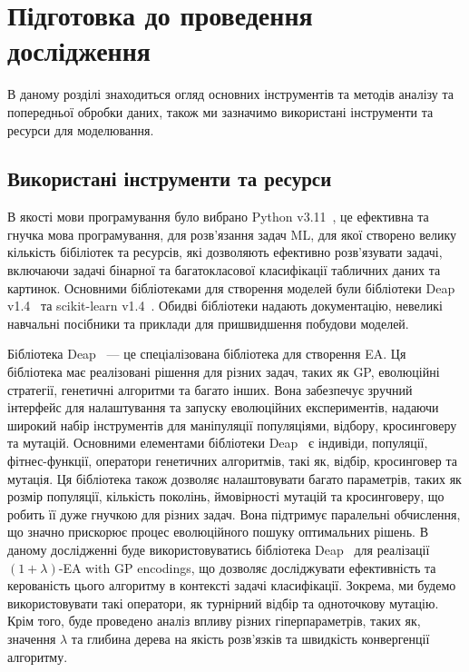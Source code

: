 \chapter{Підготовка до проведення дослідження}
\label{chap:theory}

В даному розділі знаходиться огляд основних інструментів та методів аналізу та попередньої обробки даних, також ми зазначимо використані інструменти та ресурси для моделювання.

\section{Використані інструменти та ресурси}

В якості мови програмування було вибрано Python v3.11~\cite{ct18}, це ефективна та гнучка мова програмування, для розв'язання задач ML, для якої створено велику кількість бібіліотек та ресурсів, які дозволяють ефективно розв'язувати задачі, включаючи задачі бінарної та багатокласової класифікації табличних даних та картинок. Основними бібліотеками для створення моделей були бібліотеки Deap v1.4~\cite{ct19} та scikit-learn v1.4~\cite{ct20}. Обидві бібліотеки надають документацію, невеликі навчальні посібники та приклади для пришвидшення побудови моделей.

Бібліотека Deap~\cite{ct19} --- це спеціалізована бібліотека для створення EA. Ця бібліотека має реалізовані рішення для різних задач, таких як GP, еволюційні стратегії, генетичні алгоритми та багато інших. Вона забезпечує зручний інтерфейс для налаштування та запуску еволюційних експериментів, надаючи широкий набір інструментів для маніпуляції популяціями, відбору, кросинговеру та мутацій. Основними елементами бібліотеки Deap~\cite{ct19} є індивіди, популяції, фітнес-функції, оператори генетичних алгоритмів, такі як, відбір, кросинговер та мутація. Ця бібліотека також дозволяє налаштовувати багато параметрів, таких як розмір популяції, кількість поколінь, ймовірності мутацій та кросинговеру, що робить її дуже гнучкою для різних задач. Вона підтримує паралельні обчислення, що значно прискорює процес еволюційного пошуку оптимальних рішень. В даному дослідженні буде використовуватись бібліотека Deap~\cite{ct19} для реалізації $(1+\lambda)$-EA with GP encodings, що дозволяє досліджувати ефективність та керованість цього алгоритму в контексті задачі класифікації. Зокрема, ми будемо використовувати такі оператори, як турнірний відбір та одноточкову мутацію. Крім того, буде проведено аналіз впливу різних гіперпараметрів, таких як, значення $\lambda$ та глибина дерева на якість розв'язків та швидкість конвергенції алгоритму.

